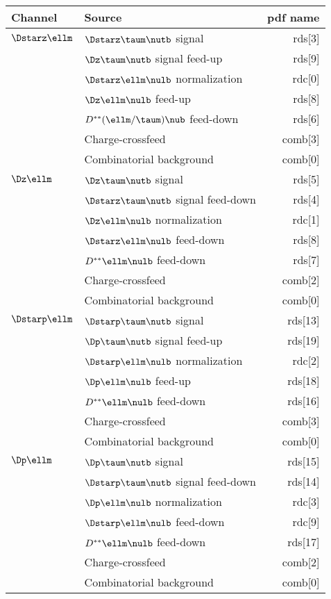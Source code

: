 \documentclass[6pt]{article}
\begin{document}
\begin{tabular}{l l r}\\ \hline\hline
Channel          & Source  & pdf name\\ \hline
$\Dstarz\ellm$   & $\Dstarz\taum\nutb$ signal           & rds[3]   \\
                 & $\Dz\taum\nutb$ signal feed-up       & rds[9] \\
                 & $\Dstarz\ellm\nulb$ normalization    & rdc[0]  \\
                 & $\Dz\ellm\nulb$ feed-up              & rds[8]   \\
                 & $D^{**}(\ellm/\taum)\nub$ feed-down  & rds[6]   \\
                 & Charge-crossfeed                     & comb[3] \\
                 & Combinatorial background             & comb[0] \\ \hline
$\Dz\ellm$       & $\Dz\taum\nutb$ signal               & rds[5] \\
                 & $\Dstarz\taum\nutb$ signal feed-down & rds[4] \\
                 & $\Dz\ellm\nulb$ normalization        & rdc[1] \\
                 & $\Dstarz\ellm\nulb$ feed-down        & rds[8] \\
                 & $D^{**}\ellm\nulb$ feed-down         & rds[7] \\
                 & Charge-crossfeed                     & comb[2] \\
                 & Combinatorial background             & comb[0] \\ \hline
$\Dstarp\ellm$   & $\Dstarp\taum\nutb$ signal           & rds[13] \\
                 & $\Dp\taum\nutb$ signal feed-up       & rds[19] \\
                 & $\Dstarp\ellm\nulb$ normalization    & rdc[2] \\
                 & $\Dp\ellm\nulb$ feed-up              & rds[18]   \\
                 & $D^{**}\ellm\nulb$ feed-down         & rds[16] \\
                 & Charge-crossfeed                     & comb[3] \\
                 & Combinatorial background             & comb[0] \\ \hline
$\Dp\ellm$       & $\Dp\taum\nutb$ signal               & rds[15] \\
                 & $\Dstarp\taum\nutb$ signal feed-down & rds[14] \\
                 & $\Dp\ellm\nulb$ normalization        & rdc[3] \\
                 & $\Dstarp\ellm\nulb$ feed-down        & rdc[9] \\
                 & $D^{**}\ellm\nulb$ feed-down         & rds[17] \\
                 & Charge-crossfeed                     & comb[2] \\
                 & Combinatorial background             & comb[0] \\ \hline\hline
\end{tabular}
\end{document}
